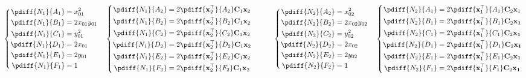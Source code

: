 \documentclass{article}
\begin{document}
\begin{align*}
  \left\{\begin{aligned}
    \pdiff{N_1}{A_1}&=x_{01}^2\\
    \pdiff{N_1}{B_1}&=2x_{01}y_{01}\\
    \pdiff{N_1}{C_1}&=y_{01}^2\\
    \pdiff{N_1}{D_1}&=2x_{01}\\
    \pdiff{N_1}{E_1}&=2y_{01}\\
    \pdiff{N_1}{F_1}&=1
  \end{aligned}\right.\quad\left\{\begin{aligned}
    \pdiff{N_1}{A_2}&=2\pdiff{\mathbf{x}_2^\top}{A_2}\mathbf{C}_1\mathbf{x}_2\\
    \pdiff{N_1}{B_2}&=2\pdiff{\mathbf{x}_2^\top}{B_2}\mathbf{C}_1\mathbf{x}_2\\
    \pdiff{N_1}{C_2}&=2\pdiff{\mathbf{x}_2^\top}{C_2}\mathbf{C}_1\mathbf{x}_2\\
    \pdiff{N_1}{D_2}&=2\pdiff{\mathbf{x}_2^\top}{D_2}\mathbf{C}_1\mathbf{x}_2\\
    \pdiff{N_1}{E_2}&=2\pdiff{\mathbf{x}_2^\top}{E_2}\mathbf{C}_1\mathbf{x}_2\\
    \pdiff{N_1}{F_2}&=2\pdiff{\mathbf{x}_2^\top}{F_2}\mathbf{C}_1\mathbf{x}_2
  \end{aligned}\right.\quad\quad\quad \left\{\begin{aligned}
    \pdiff{N_2}{A_2}&=x_{02}^2\\
    \pdiff{N_2}{B_2}&=2x_{02}y_{02}\\
    \pdiff{N_2}{C_2}&=y_{02}^2\\
    \pdiff{N_2}{D_2}&=2x_{02}\\
    \pdiff{N_2}{E_2}&=2y_{02}\\
    \pdiff{N_2}{F_2}&=1
  \end{aligned}\right.\quad \left\{\begin{aligned}
    \pdiff{N_2}{A_1}&=2\pdiff{\mathbf{x}_1^\top}{A_1}\mathbf{C}_2\mathbf{x}_1\\
    \pdiff{N_2}{B_1}&=2\pdiff{\mathbf{x}_1^\top}{B_1}\mathbf{C}_2\mathbf{x_1}\\
    \pdiff{N_2}{C_1}&=2\pdiff{\mathbf{x}_1^\top}{C_1}\mathbf{C}_2\mathbf{x_1}\\
    \pdiff{N_2}{D_1}&=2\pdiff{\mathbf{x}_1^\top}{D_1}\mathbf{C}_2\mathbf{x_1}\\
    \pdiff{N_2}{E_1}&=2\pdiff{\mathbf{x}_1^\top}{E_1}\mathbf{C}_2\mathbf{x_1}\\
    \pdiff{N_2}{F_1}&=2\pdiff{\mathbf{x}_1^\top}{F_1}\mathbf{C}_2\mathbf{x_1}
  \end{aligned}\right.
\end{align*}\par
\end{document}

